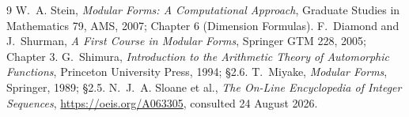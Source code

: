 \documentclass[11pt,a4paper]{article}
\theoremstyle{plain}
\theoremstyle{definition}
\begin{document}
\begin{thebibliography}{9}
 W.~A. Stein, \emph{Modular Forms: A Computational Approach}, Graduate
Studies in Mathematics 79, AMS, 2007; Chapter 6 (Dimension Formulas).
 F.~Diamond and J.~Shurman, \emph{A First Course in Modular Forms}, Springer
GTM 228, 2005; Chapter 3.
 G.~Shimura, \emph{Introduction to the Arithmetic Theory of Automorphic
Functions}, Princeton University Press, 1994; \S2.6.
 T.~Miyake, \emph{Modular Forms}, Springer, 1989; \S2.5.
 N.~J.~A. Sloane et al., \emph{The On-Line Encyclopedia of Integer
Sequences}, \url{https://oeis.org/A063305}, consulted 24 August 2026.
\end{thebibliography}
\end{document}
